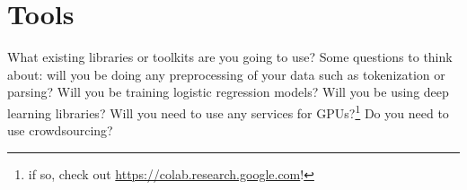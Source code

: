 \documentclass[11pt,a4paper]{article}
\begin{document}
\section{Tools}
What existing libraries or toolkits are you going to use? 
Some questions to think about: will you be doing any preprocessing of your data such as tokenization or parsing? 
Will you be training logistic regression models? Will you be using deep learning libraries? 
Will you need to use any services for GPUs?\footnote{if so, check out \url{https://colab.research.google.com}!} 
Do you need to use crowdsourcing?


\footnotesize

\end{document}
